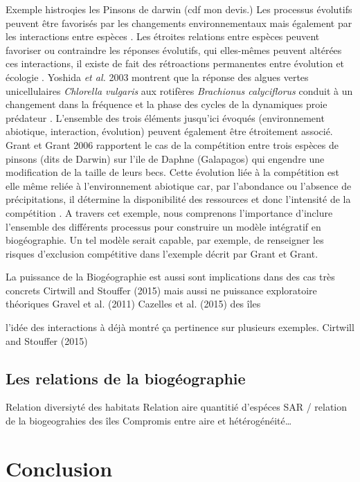 Exemple histroqies les Pinsons de darwin (cdf mon devis.) Les processus
évolutifs peuvent être favorisés par les changements environnementaux
mais également par les interactions entre espèces \cite{Tingley2009}.
Les étroites relations entre espèces peuvent favoriser ou contraindre
les réponses évolutifs, qui elles-mêmes peuvent altérées ces
interactions, il existe de fait des rétroactions permanentes entre
évolution et écologie \cite{Post2009}. Yoshida \textit{et al.} 2003
montrent que la réponse des algues vertes unicellulaires
\textit{Chlorella vulgaris} aux rotifères
\textit{Brachionus calyciflorus} conduit à un changement dans la
fréquence et la phase des cycles de la dynamiques proie prédateur
\cite{Yoshida2003}. L'ensemble des trois éléments jusqu'ici évoqués
(environnement abiotique, interaction, évolution) peuvent également être
étroitement associé. Grant et Grant 2006 rapportent le cas de la
compétition entre trois espèces de pinsons (dits de Darwin) sur l'ile de
Daphne (Galapagos) qui engendre une modification de la taille de leurs
becs. Cette évolution liée à la compétition est elle même reliée à
l'environnement abiotique car, par l'abondance ou l'absence de
précipitations, il détermine la disponibilité des ressources et donc
l'intensité de la compétition \cite{Grant2006}. A travers cet exemple,
nous comprenons l'importance d'inclure l'ensemble des différents
processus pour construire un modèle intégratif en biogéographie. Un tel
modèle serait capable, par exemple, de renseigner les risques
d'exclusion compétitive dans l'exemple décrit par Grant et Grant.

La puissance de la Biogéographie est aussi sont implications dans des
cas très concrets Cirtwill and Stouffer (2015) mais aussi ne puissance
exploratoire théoriques Gravel et al. (2011) Cazelles et al. (2015) des
îles

l'idée des interactions à déjà montré ça pertinence sur plusieurs
exemples. Cirtwill and Stouffer (2015)

\subsection{Les relations de la
biogéographie}\label{les-relations-de-la-bioguxe9ographie}

Relation diversiyté des habitats Relation aire quantitié d'espéces SAR /
relation de la biogeograhies des îles Compromis entre aire et
hétérogénéité\ldots{}

\section{Conclusion}\label{conclusion}


